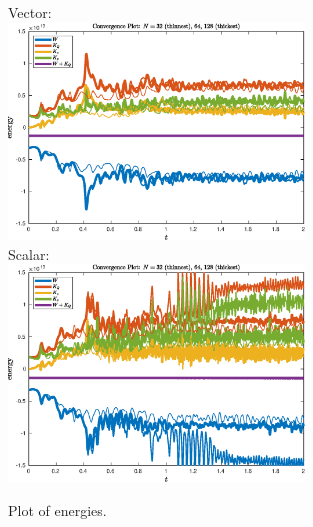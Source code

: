 \documentclass{article}
\begin{document}
\newpage

\begin{figure}[ht]
\centering
Vector: \\
\includegraphics[width=0.7\textwidth]{energies2.eps}  \\ \bigskip
Scalar: \\
\includegraphics[width=0.7\textwidth]{energies2_scalar.eps} 
\caption{Plot of energies.}
\end{figure}
\end{document}
